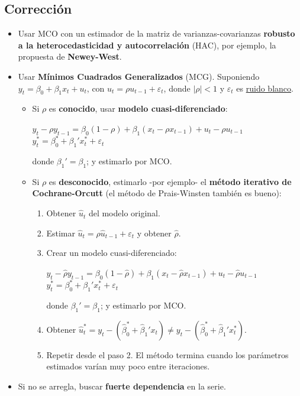\documentclass[10pt, a4paper, landscape]{extarticle}
\begin{document}
\begin{multicols}{3}
	\subsection*{Corrección}
		\begin{itemize}[leftmargin=*]
			\item Usar MCO con un estimador de la matriz de varianzas-covarianzas \textbf{robusto a la heterocedasticidad y autocorrelación} (HAC), por ejemplo, la propuesta de \textbf{Newey-West}.
			\item Usar \textbf{Mínimos Cuadrados Generalizados} (MCG). Suponiendo $y_t = \beta_0 + \beta_1 x_t + u_t$, con $u_t = \rho u_{t-1} + \varepsilon_t$, donde $|\rho| < 1$ y $\varepsilon_t$ es \underline{ruido blanco}.
			\begin{itemize}[leftmargin=*]
				\item Si $\rho$ es \textbf{conocido}, usar \textbf{modelo cuasi-diferenciado}:
				\begin{center}
					$y_t - \rho y_{t-1} = \beta_0 (1 - \rho) + \beta_1 (x_t - \rho x_{t-1}) + u_t - \rho u_{t-1}$
					\ $y_t^* = \beta_0^* + \beta_1' x_t^* + \varepsilon_t$
				\end{center}
				donde $\beta_1' = \beta_1$; y estimarlo por MCO.
				\item Si $\rho$ es \textbf{desconocido}, estimarlo -por ejemplo- el \textbf{método iterativo de Cochrane-Orcutt} (el método de Prais-Winsten también es bueno):
				\begin{enumerate}[leftmargin=*]
					\item Obtener $\hat{u}_t$ del modelo original.
					\item Estimar $\hat{u}_t = \rho \hat{u}_{t-1} + \varepsilon_t$ y obtener $\hat{\rho}$.
					\item Crear un modelo cuasi-diferenciado:
					\begin{center}
						$y_t - \hat{\rho} y_{t-1} = \beta_0 (1 - \hat{\rho}) + \beta_1 (x_t - \hat{\rho} x_{t-1}) + u_t - \hat{\rho} u_{t-1}$
						\ $y_t^* = \beta_0^* + \beta_1' x_t^* + \varepsilon_t$
					\end{center}
					donde $\beta_1' = \beta_1$; y estimarlo por MCO.
					\item Obtener $\hat{u}_t^* = y_t - (\hat{\beta}_0^* + \hat{\beta}_1' x_t) \neq y_t - (\hat{\beta}_0^* + \hat{\beta}_1' x_t^*)$.
					\item Repetir desde el paso 2. El método termina cuando los parámetros estimados varían muy poco entre iteraciones.
				\end{enumerate}
			\end{itemize}
		\item Si no se arregla, buscar \textbf{fuerte dependencia} en la serie.
		\end{itemize}


\end{multicols}
\end{document}
